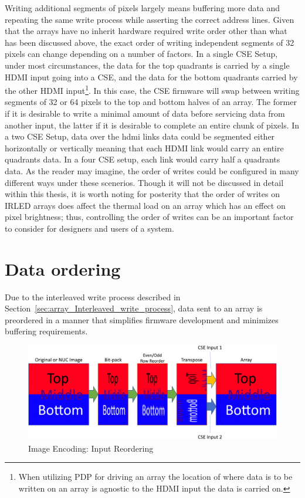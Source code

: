     Writing additional segments of pixels largely means buffering more data and repeating the same write process while asserting the correct address lines. Given that the arrays have no inherit hardware required write order other than what has been discussed above, the exact order of writing independent segments of 32 pixels can change depending on a number of factors. In a single CSE Setup, under most circumstances, the data for the top quadrants is carried by a single HDMI input going into a CSE, and the data for the bottom quadrants carried by the other HDMI input\footnote{When utilizing PDP for driving an array the location of where data is to be written on an array is agnostic to the HDMI input the data is carried on.}. In this case, the CSE firmware will swap between writing segments of 32 or 64 pixels to the top and bottom halves of an array. The former if it is desirable to write a minimal amount of data before servicing data from another input, the latter if it is desirable to complete an entire chunk of pixels. In a two CSE Setup, data over the hdmi links data could be segmented either horizontally or vertically meaning that each HDMI link would carry an entire quadrants data. In a four CSE setup, each link would carry half a quadrants data. As the reader may imagine, the order of writes could be configured in many different ways under these scenerios. Though it will not be discussed in detail within this thesis, it is worth noting for posterity that the order of writes on IRLED arrays does affect the thermal load on an array which has an effect on pixel brightness\cite{BarakhshanEtAl2017, LaVeigneSieglinger2012, norton2}; thus, controlling the order of writes can be an important factor to consider for designers and users of a system.

\section{Data ordering}
    Due to the interleaved write process described in Section~\ref{sec:array_Interleaved_write_process}, data sent to an array is preordered in a manner that simplifies firmware development and minimizes buffering requirements.

    \begin{figure}
        \centering
        \includegraphics[trim=0in 0in 0in 0in,width=1.0\textwidth]{fig/image_encoding.pdf}
        \caption{Image Encoding: Input Reordering}
        \label{fig:image_encoding}
    \end{figure}

